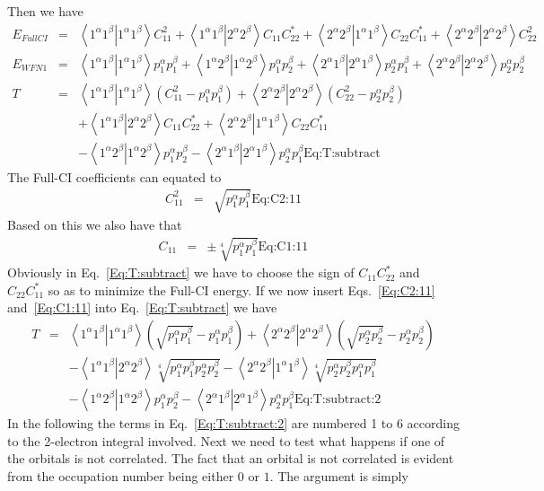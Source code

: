 \documentclass[pra,nofootinbib]{revtex4-1}
\newcommand{\eria}[4]{\left\langle #1^\alpha #2^\beta \right.\left| #3^\alpha #4^\beta \right\rangle}
\newcommand{\dlabel}[1]{\text{#1}\label{#1}}
\begin{document}
Then we have
\begin{eqnarray}
   E_{FullCI} &=& \eria{1}{1}{1}{1} C_{11}^2 + \eria{1}{1}{2}{2} C_{11}C_{22}^*
               +  \eria{2}{2}{1}{1} C_{22}C_{11}^* + \eria{2}{2}{2}{2} C_{22}^2 \\
   E_{WFN1}   &=& \eria{1}{1}{1}{1} p_1^\alpha p_1^\beta + \eria{1}{2}{1}{2} p_1^\alpha p_2^\beta
               +  \eria{2}{1}{2}{1} p_2^\alpha p_1^\beta + \eria{2}{2}{2}{2} p_2^\alpha p_2^\beta \\
   T
   &=& \eria{1}{1}{1}{1} (C_{11}^2-p_1^\alpha p_1^\beta)
    +  \eria{2}{2}{2}{2} (C_{22}^2-p_2^\alpha p_2^\beta) \nonumber \\
   &&+ \eria{1}{1}{2}{2} C_{11}C_{22}^*
    +  \eria{2}{2}{1}{1} C_{22}C_{11}^*       \nonumber \\
   &&- \eria{1}{2}{1}{2} p_1^\alpha p_2^\beta
    -  \eria{2}{1}{2}{1} p_2^\alpha p_1^\beta 
   \dlabel{Eq:T:subtract}
\end{eqnarray}
The Full-CI coefficients can equated to
\begin{eqnarray}
C_{11}^2 &=& \sqrt{p_1^\alpha p_1^\beta} 
             \dlabel{Eq:C2:11}
\end{eqnarray}
Based on this we also have that
\begin{eqnarray}
C_{11} &=& \pm\sqrt[4]{p_1^\alpha p_1^\beta} 
           \dlabel{Eq:C1:11}
\end{eqnarray}
Obviously in Eq.~\ref{Eq:T:subtract} we have to choose the sign of $C_{11}C^*_{22}$ and 
$C_{22}C^*_{11}$ so as to minimize
the Full-CI energy. If we now insert Eqs.~\ref{Eq:C2:11} and~\ref{Eq:C1:11} into Eq.~\ref{Eq:T:subtract} we have
\begin{eqnarray}
   T
   &=& \eria{1}{1}{1}{1} (\sqrt{p_1^\alpha p_1^\beta}-p_1^\alpha p_1^\beta)
    +  \eria{2}{2}{2}{2} (\sqrt{p_2^\alpha p_2^\beta}-p_2^\alpha p_2^\beta) \nonumber \\
   &&- \eria{1}{1}{2}{2} \sqrt[4]{p_1^\alpha p_1^\beta p_2^\alpha p_2^\beta}
    -  \eria{2}{2}{1}{1} \sqrt[4]{p_2^\alpha p_2^\beta p_1^\alpha p_1^\beta} \nonumber \\
   &&- \eria{1}{2}{1}{2} p_1^\alpha p_2^\beta
    -  \eria{2}{1}{2}{1} p_2^\alpha p_1^\beta 
   \dlabel{Eq:T:subtract:2}
\end{eqnarray}
In the following the terms in Eq.~\ref{Eq:T:subtract:2} are numbered 1 to 6 according to the 2-electron
integral involved.
Next we need to test what happens if one of the orbitals is not correlated. 
The fact that an
orbital is not correlated is evident from the occupation number being either $0$ or $1$. The argument is simply
\end{document}
